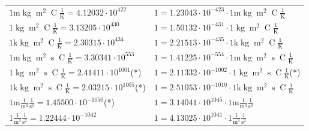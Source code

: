 \begin{center}
\begin{longtable}{l l}
{\color{gray}$1 \bm{\mathrm{ m}}\operatorname{kg}{\operatorname{m}^2}{}{\operatorname{C}}\frac1{\operatorname{K}} = 4.12032\cdot10^{422} $}   & {\color{gray}$ 1 = 1.23043\cdot10^{-423} \cdot 1 \bm{\mathrm{ m}}\operatorname{kg}{\operatorname{m}^2}{}{\operatorname{C}}\frac1{\operatorname{K}}$}  \\
{\color{black}$1 \bm{\mathrm{ }}\operatorname{kg}{\operatorname{m}^2}{}{\operatorname{C}}\frac1{\operatorname{K}} = 3.13205\cdot10^{430} $}   & {\color{black}$ 1 = 1.50132\cdot10^{-431} \cdot 1 \bm{\mathrm{ }}\operatorname{kg}{\operatorname{m}^2}{}{\operatorname{C}}\frac1{\operatorname{K}}$}  \\
{\color{gray}$1 \bm{\mathrm{ k}}\operatorname{kg}{\operatorname{m}^2}{}{\operatorname{C}}\frac1{\operatorname{K}} = 2.30315\cdot10^{434} $}   & {\color{gray}$ 1 = 2.21513\cdot10^{-435} \cdot 1 \bm{\mathrm{ k}}\operatorname{kg}{\operatorname{m}^2}{}{\operatorname{C}}\frac1{\operatorname{K}}$}  \\
{\color{gray}$1 \bm{\mathrm{ m}}\operatorname{kg}{\operatorname{m}^2}{\operatorname{s}}{\operatorname{C}}\frac1{\operatorname{K}} = 3.30341\cdot10^{553} $}   & {\color{gray}$ 1 = 1.41225\cdot10^{-554} \cdot 1 \bm{\mathrm{ m}}\operatorname{kg}{\operatorname{m}^2}{\operatorname{s}}{\operatorname{C}}\frac1{\operatorname{K}}$}  \\
{\color{black}$1 \bm{\mathrm{ }}\operatorname{kg}{\operatorname{m}^2}{\operatorname{s}}{\operatorname{C}}\frac1{\operatorname{K}} = 2.41411\cdot10^{1001} $}\quad(*) & {\color{black}$ 1 = 2.11332\cdot10^{-1002} \cdot 1 \bm{\mathrm{ }}\operatorname{kg}{\operatorname{m}^2}{\operatorname{s}}{\operatorname{C}}\frac1{\operatorname{K}}$}\quad(*)\\
{\color{gray}$1 \bm{\mathrm{ k}}\operatorname{kg}{\operatorname{m}^2}{\operatorname{s}}{\operatorname{C}}\frac1{\operatorname{K}} = 2.03215\cdot10^{1005} $}\quad(*) & {\color{gray}$ 1 = 2.51053\cdot10^{-1010} \cdot 1 \bm{\mathrm{ k}}\operatorname{kg}{\operatorname{m}^2}{\operatorname{s}}{\operatorname{C}}\frac1{\operatorname{K}}$}  \\
\hline{\color{gray}$1 \bm{\mathrm{ m}}\frac1{\operatorname{m}^3}\frac1{\operatorname{s}^2}{}{} = 1.45500\cdot10^{-1050} $}\quad(*) & {\color{gray}$ 1 = 3.14041\cdot10^{1045} \cdot 1 \bm{\mathrm{ m}}\frac1{\operatorname{m}^3}\frac1{\operatorname{s}^2}{}{}$}  \\
{\color{black}$1 \bm{\mathrm{ }}\frac1{\operatorname{m}^3}\frac1{\operatorname{s}^2}{}{} = 1.22444\cdot10^{-1042} $}   & {\color{black}$ 1 = 4.13025\cdot10^{1041} \cdot 1 \bm{\mathrm{ }}\frac1{\operatorname{m}^3}\frac1{\operatorname{s}^2}{}{}$}  \\

\end{longtable}
\end{center}
